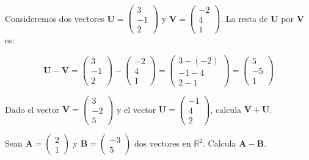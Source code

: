 \begin{example}
    Consideremos dos vectores \( \mathbf{U} = \begin{pmatrix} 3 \\ -1 \\ 2 \end{pmatrix} \) y \( \mathbf{V} = \begin{pmatrix} -2 \\ 4 \\ 1 \end{pmatrix} \). La resta de \( \mathbf{U} \) por \( \mathbf{V} \) es:

\[
\boldsymbol{U} - \boldsymbol{V} = \begin{pmatrix} 3 \\ -1 \\ 2 \end{pmatrix} - \begin{pmatrix} -2 \\ 4 \\ 1 \end{pmatrix} = \begin{pmatrix} 3 - (-2) \\ -1 - 4 \\ 2 - 1 \end{pmatrix} = \begin{pmatrix} 5 \\ -5 \\ 1 \end{pmatrix}
\]
\end{example}
\begin{exercise}
Dado el vector \( \mathbf{V} = \begin{pmatrix} 3 \\ -2 \\ 5 \end{pmatrix} \) y el vector \( \mathbf{U} = \begin{pmatrix} -1 \\ 4 \\ 2 \end{pmatrix} \), calcula \( \mathbf{V} + \mathbf{U} \).
\end{exercise}
\begin{exercise}
Sean \( \mathbf{A} = \begin{pmatrix} 2 \\ 1 \end{pmatrix} \) y \( \mathbf{B} = \begin{pmatrix} -3 \\ 5 \end{pmatrix} \) dos vectores en \( \mathbb{R}^2 \). Calcula \( \mathbf{A} - \mathbf{B} \).
\end{exercise}
